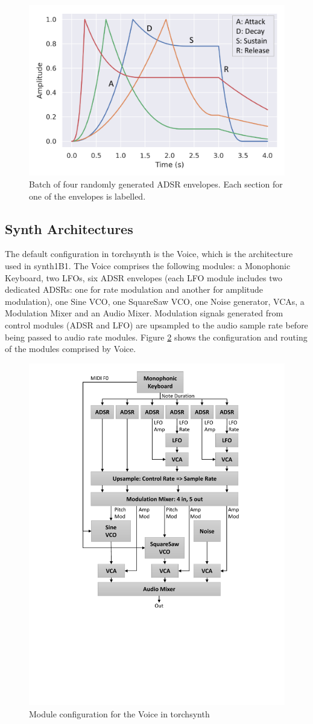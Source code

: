 \begin{figure}[t]
    \centering
    \includegraphics[width=0.66\linewidth]{ADSR.pdf}
  \vspace{-1.5em}
    \caption{Batch of four randomly generated ADSR envelopes.
    Each section for one of the envelopes is labelled.}
    \label{fig:adsr}
\end{figure}

\subsection{Synth Architectures}

The default configuration in torchsynth is the Voice, which is the architecture used in synth1B1. The Voice comprises the following modules: a Monophonic Keyboard, two LFOs, six ADSR envelopes (each LFO module includes two dedicated ADSRs: one for rate modulation and another for amplitude modulation), one Sine VCO, one SquareSaw VCO, one Noise generator, VCAs, a Modulation Mixer and an Audio Mixer. Modulation signals generated from control modules (ADSR and LFO) are upsampled to the audio sample rate before being passed to audio rate modules. Figure \ref{fig:voice_diagram} shows the configuration and routing of the modules comprised by Voice. 

\begin{figure}[t]
    \centering
    \includegraphics[width=0.6\linewidth]{SynthDiagram_3.pdf}
  \vspace{-1.5em}
    \caption{Module configuration for the Voice in torchsynth}
    \label{fig:voice_diagram}
\end{figure}

